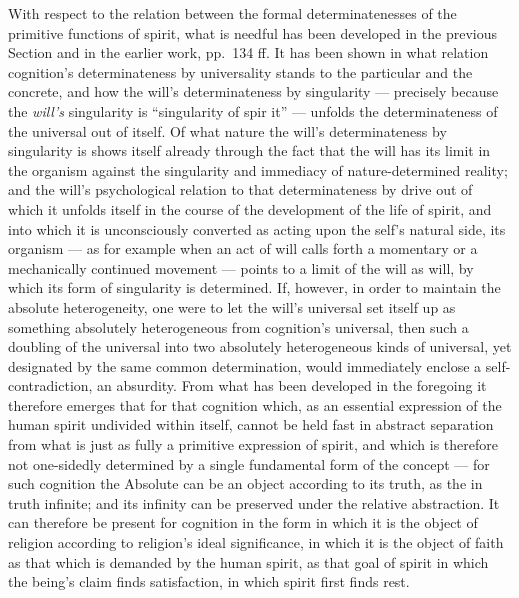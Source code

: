 \documentclass[12pt,a4paper]{book}
\begin{document}
With respect to the relation between the formal determinatenesses of the
primitive functions of spirit, what is needful has been developed in the
previous Section and in the earlier work, pp.\ 134 ff. It has been shown in
what relation cognition's determinateness by universality stands to the
particular and the concrete, and how the will's determinateness by singularity
--- precisely because the \emph{will's} singularity is ``singularity of
spir\-%
it'' --- unfolds the determinateness of the universal out of itself. Of what
nature the will's determinateness by singularity is shows itself already
through the fact that the will has its limit in the organism against the
singularity and immediacy of nature-determined reality; and the will's
psychological relation to that determinateness by drive out of which it
unfolds itself in the course of the development of the life of spirit, and
into which it is unconsciously converted as acting upon the self's natural
side, its organism --- as for example when an act of will calls forth a
momentary or a mechanically continued movement --- points to a limit of the
will as will, by which its form of singularity is determined. If, however, in
order to maintain the absolute heterogeneity, one were to let the will's
universal set itself up as something absolutely heterogeneous from cognition's
universal, then such a doubling of the universal into two absolutely
heterogeneous kinds of universal, yet designated by the same common
determination, would immediately enclose a self-contradiction, an absurdity.
From what has been developed in the foregoing it therefore emerges that for
that cognition which, as an essential expression of the human spirit undivided
within itself, cannot be held fast in abstract separation from what is just as
fully a primitive expression of spirit, and which is therefore not
one-sidedly determined by a single fundamental form of the concept --- for
such cognition the Absolute can be an object according to its truth, as the in
truth infinite; and its infinity can be preserved under the relative
abstraction. It can therefore be present for cognition in the form in which it
is the object of religion according to religion's ideal significance, in which
it is the object of faith as that which is demanded by the human spirit, as
that goal of spirit in which the being's claim finds satisfaction, in which
spirit first finds rest.
\end{document}
